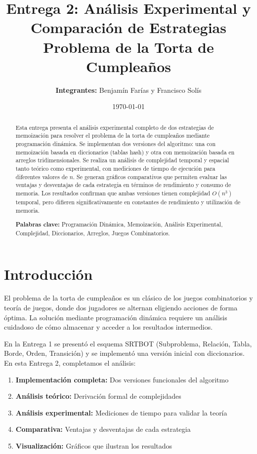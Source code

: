 \documentclass[12pt,letterpaper]{article}
\title{\textbf{Entrega 2: Análisis Experimental y Comparación de Estrategias\\Problema de la Torta de Cumpleaños}}
\author{\textbf{Integrantes:} Benjamín Farías y Francisco Solís}
\date{\today}
\begin{document}
\maketitle

\begin{abstract}
Esta entrega presenta el análisis experimental completo de dos estrategias de memoización para resolver el problema de la torta de cumpleaños mediante programación dinámica. Se implementan dos versiones del algoritmo: una con memoización basada en diccionarios (tablas hash) y otra con memoización basada en arreglos tridimensionales. Se realiza un análisis de complejidad temporal y espacial tanto teórico como experimental, con mediciones de tiempo de ejecución para diferentes valores de $n$. Se generan gráficos comparativos que permiten evaluar las ventajas y desventajas de cada estrategia en términos de rendimiento y consumo de memoria. Los resultados confirman que ambas versiones tienen complejidad $O(n^3)$ temporal, pero difieren significativamente en constantes de rendimiento y utilización de memoria.

\textbf{Palabras clave:} Programación Dinámica, Memoización, Análisis Experimental, Complejidad, Diccionarios, Arreglos, Juegos Combinatorios.
\end{abstract}

\newpage
\tableofcontents
\newpage

\section{Introducción}

El problema de la torta de cumpleaños es un clásico de los juegos combinatorios y teoría de juegos, donde dos jugadores se alternan eligiendo acciones de forma óptima. La solución mediante programación dinámica requiere un análisis cuidadoso de cómo almacenar y acceder a los resultados intermedios.

En la Entrega 1 se presentó el esquema SRTBOT (Subproblema, Relación, Tabla, Borde, Orden, Transición) y se implementó una versión inicial con diccionarios. En esta Entrega 2, completamos el análisis:

\begin{enumerate}
    \item \textbf{Implementación completa:} Dos versiones funcionales del algoritmo
    \item \textbf{Análisis teórico:} Derivación formal de complejidades
    \item \textbf{Análisis experimental:} Mediciones de tiempo para validar la teoría
    \item \textbf{Comparativa:} Ventajas y desventajas de cada estrategia
    \item \textbf{Visualización:} Gráficos que ilustran los resultados
\end{enumerate}
\end{document}
